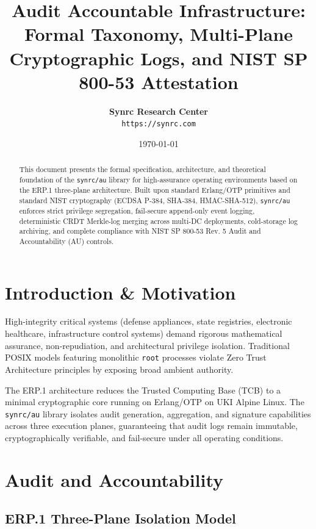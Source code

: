 \documentclass{article}
\title{\textbf{Audit Accountable Infrastructure:}\\Formal Taxonomy, Multi-Plane Cryptographic Logs, and NIST SP 800-53 Attestation}
\author{\textbf{Synrc Research Center} \\ \texttt{https://synrc.com}}
\date{\today}
\begin{document}
\maketitle

\begin{abstract}
This document presents the formal specification, architecture, and theoretical foundation of the \texttt{synrc/au}
library for high-assurance operating environments based on the ERP.1 three-plane architecture. Built upon standard
Erlang/OTP primitives and standard NIST cryptography (ECDSA P-384, SHA-384, HMAC-SHA-512), \texttt{synrc/au}
enforces strict privilege segregation, fail-secure append-only event logging, deterministic CRDT Merkle-log
merging across multi-DC deployments, cold-storage log archiving, and complete compliance with
NIST SP 800-53 Rev. 5 Audit and Accountability (AU) controls.
\end{abstract}

\newpage
\tableofcontents

\newpage
\section{Introduction \& Motivation}

High-integrity critical systems (defense appliances, state registries, electronic healthcare,
infrastructure control systems) demand rigorous mathematical assurance, non-repudiation, and
architectural privilege isolation. Traditional POSIX models featuring monolithic \texttt{root}
processes violate Zero Trust Architecture principles by exposing broad ambient authority.

The ERP.1 architecture reduces the Trusted Computing Base (TCB) to a minimal cryptographic core
running on Erlang/OTP on UKI Alpine Linux. The \texttt{synrc/au} library isolates audit generation,
aggregation, and signature capabilities across three execution planes, guaranteeing that audit
logs remain immutable, cryptographically verifiable, and fail-secure under all operating conditions.

\section{Audit and Accountability}

\subsection{ERP.1 Three-Plane Isolation Model}
\end{document}
